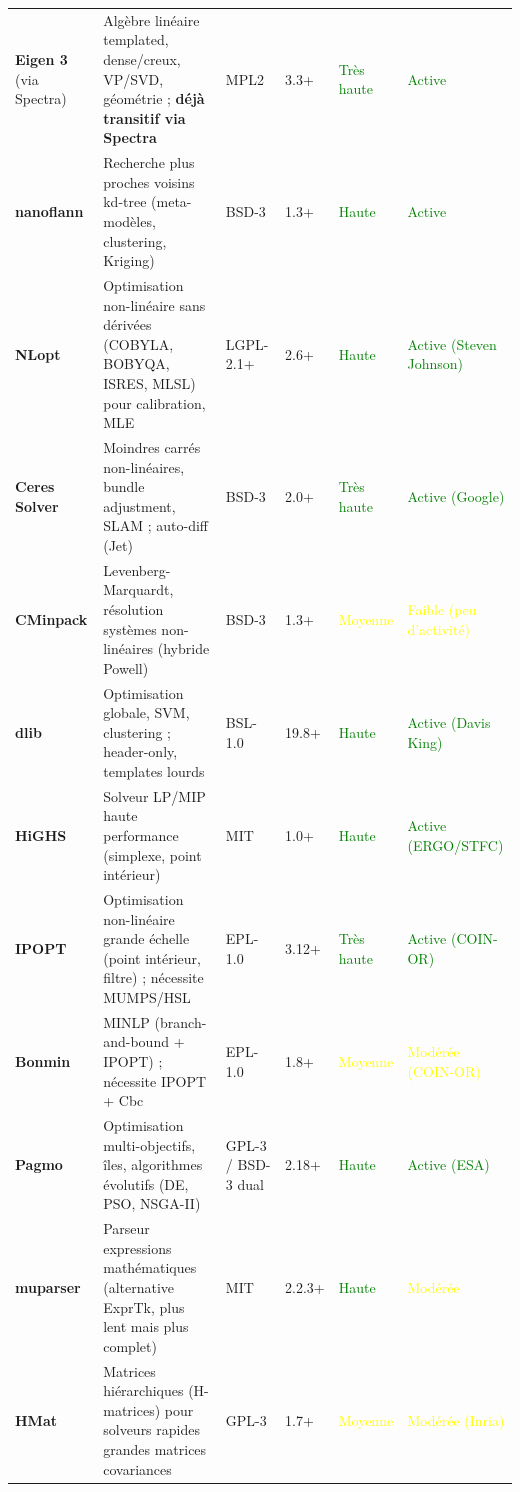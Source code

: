 \documentclass[11pt,a4paper]{article}
\begin{document}
\begin{longtable}{@{}p{2.2cm}p{3.5cm}p{2.5cm}p{1.8cm}p{2.5cm}p{2.5cm}@{}}
\textbf{Eigen 3} (via Spectra) & Algèbre linéaire templated, dense/creux, VP/SVD, géométrie ; \textbf{déjà transitif via Spectra} & MPL2 & 3.3+ & \textcolor{green}{Très haute} & \textcolor{green}{Active} \\
\textbf{nanoflann} & Recherche plus proches voisins kd-tree (meta-modèles, clustering, Kriging) & BSD-3 & 1.3+ & \textcolor{green}{Haute} & \textcolor{green}{Active} \\
\textbf{NLopt} & Optimisation non-linéaire sans dérivées (COBYLA, BOBYQA, ISRES, MLSL) pour calibration, MLE & LGPL-2.1+ & 2.6+ & \textcolor{green}{Haute} & \textcolor{green}{Active (Steven Johnson)} \\
\textbf{Ceres Solver} & Moindres carrés non-linéaires, bundle adjustment, SLAM ; auto-diff (Jet) & BSD-3 & 2.0+ & \textcolor{green}{Très haute} & \textcolor{green}{Active (Google)} \\
\textbf{CMinpack} & Levenberg-Marquardt, résolution systèmes non-linéaires (hybride Powell) & BSD-3 & 1.3+ & \textcolor{yellow}{Moyenne} & \textcolor{yellow}{Faible (peu d'activité)} \\
\textbf{dlib} & Optimisation globale, SVM, clustering ; header-only, templates lourds & BSL-1.0 & 19.8+ & \textcolor{green}{Haute} & \textcolor{green}{Active (Davis King)} \\
\textbf{HiGHS} & Solveur LP/MIP haute performance (simplexe, point intérieur) & MIT & 1.0+ & \textcolor{green}{Haute} & \textcolor{green}{Active (ERGO/STFC)} \\
\textbf{IPOPT} & Optimisation non-linéaire grande échelle (point intérieur, filtre) ; nécessite MUMPS/HSL & EPL-1.0 & 3.12+ & \textcolor{green}{Très haute} & \textcolor{green}{Active (COIN-OR)} \\
\textbf{Bonmin} & MINLP (branch-and-bound + IPOPT) ; nécessite IPOPT + Cbc & EPL-1.0 & 1.8+ & \textcolor{yellow}{Moyenne} & \textcolor{yellow}{Modérée (COIN-OR)} \\
\textbf{Pagmo} & Optimisation multi-objectifs, îles, algorithmes évolutifs (DE, PSO, NSGA-II) & GPL-3 / BSD-3 dual & 2.18+ & \textcolor{green}{Haute} & \textcolor{green}{Active (ESA)} \\
\textbf{muparser} & Parseur expressions mathématiques (alternative ExprTk, plus lent mais plus complet) & MIT & 2.2.3+ & \textcolor{green}{Haute} & \textcolor{yellow}{Modérée} \\
\textbf{HMat} & Matrices hiérarchiques (H-matrices) pour solveurs rapides grandes matrices covariances & GPL-3 & 1.7+ & \textcolor{yellow}{Moyenne} & \textcolor{yellow}{Modérée (Inria)} \\
\bottomrule
\end{longtable}
\end{document}
